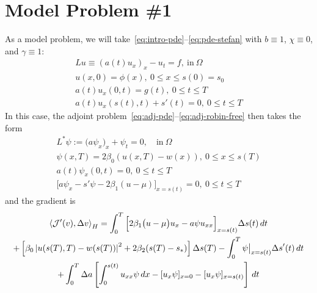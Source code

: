 \documentclass[letterpaper, 10pt]{amsart}
\theoremstyle{definition}
\theoremstyle{remark}
\newcommand{\lnorm}[1]{\left\vert #1\right\vert}%
\begin{document}
\section{Model Problem \#1}\label{sec:model-problem-1}
As a model problem, we will take~\eqref{eq:intro-pde}--\eqref{eq:pde-stefan} with $b\equiv 1$, $\chi \equiv 0$, and $\gamma \equiv 1$:
\begin{gather}
  Lu \equiv {(a(t) u_x)}_x - u_{t} = f,~\text{in}~\Omega
  \\
  u(x,0) = \phi (x),~0 \leq x \leq s(0) = s_0
  \\
  a(t) u_x (0,t) = g(t),~0 \leq t \leq T
  \\
  a(t) u_x (s(t),t) + s'(t) = 0,~0 \leq t \leq
  T
\end{gather}
In this case, the adjoint problem~\eqref{eq:adj-pde}--\eqref{eq:adj-robin-free} then takes the form
\begin{gather}
  L^{*} \psi := \big(a \psi_x\big)_x + \psi_t = 0,\quad\text{in}~\Omega
  \\
  \psi(x, T) = 2\beta_0(u(x, T) - w(x)),~0 \leq x \leq s(T)
  \\
  a(t)\psi_x(0, t) =0,~0 \leq t \leq T
  \\
  \Big[a \psi_x - s'\psi - 2\beta_1(u - \mu)\Big]_{x=s(t)}=0, ~0 \leq t \leq T
\end{gather}
and the gradient is
\begin{gather}
  \left\langle \J'(v),\Delta v \right\rangle_H
  = \int_0^T \Big[2\beta_1\big(u - \mu\big)u_x - a \psi u_{xx} \Big]_{x=s(t)} {\Delta s}(t)\,dt \nonumber
  \\
  +
  \left[\beta_0\lnorm{u(s(T),T) - w(s(T))}^2 + 2 \beta_2 (s(T) - s_*)\right] {\Delta s}(T)
  - \int_0^T \psi \big\vert_{x=s(t)} {\Delta s}'(t) \,dt\nonumber
  \\
  + \int_0^T {\Delta a} \left[
    \int_0^{s(t)}  u_{xx} \psi \,dx
    - [u_x \psi]_{x=0}
    - [u_x\psi]_{x=s(t)}
  \right]\,dt
\end{gather}
\end{document}

